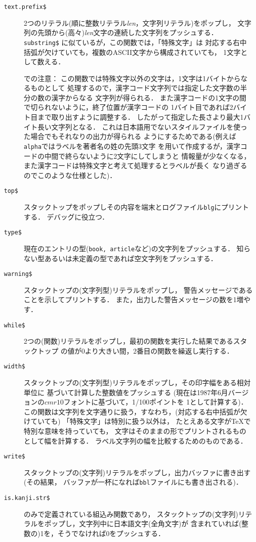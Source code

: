 \begin{description}
\item[\hbox{\tt text.prefix\$}\hfill]
2つのリテラル(順に整数リテラル{\it len}，文字列リテラル)をポップし，
文字列の先頭から(高々){\it len}文字の連続した文字列をプッシュする．
{\tt substring\$} に似ているが，この関数では，「特殊文字」は
対応する右中括弧が欠けていても，複数のASCII文字から構成されていても，
1文字として数える．

{\dg \JBibTeX での注意}：
この関数では特殊文字以外の文字は，1文字は1バイトからなるものとして
処理するので，漢字コード文字列では指定した文字数の半分の数の漢字からなる
文字列が得られる．
また漢字コードの1文字の間で切られないように，終了位置が漢字コードの
1バイト目であれば2バイト目まで取り出すように調整する．
したがって指定した長さより最大1バイト長い文字列となる．
これは日本語用でないスタイルファイルを使った場合でもそれなりの出力が得られる
ようにするためである(例えば{\tt alpha}ではラベルを著者名の姓の先頭3文字
を用いて作成するが，漢字コードの中間で終らないように2文字にしてしまうと
情報量が少なくなる，また漢字コードは特殊文字と考えて処理するとラベルが長く
なり過ぎるのでこのような仕様とした)．

\item[\hbox{\tt top\$}\hfill]
スタックトップをポップしその内容を端末とログファイル{\tt blg}にプリントする．
デバッグに役立つ．

\item[\hbox{\tt type\$}\hfill]
現在のエントリの型({\tt book, article}など)の文字列をプッシュする．
知らない型あるいは未定義の型であれば空文字列をプッシュする．

\item[\hbox{\tt warning\$}\hfill]
スタックトップの(文字列型)リテラルをポップし，
警告メッセージであることを示してプリントする．
また，出力した警告メッセージの数を1増やす．

\item[\hbox{\tt while\$}\hfill]
2つの(関数)リテラルをポップし，最初の関数を実行した結果であるスタックトップ
の値が0より大きい間，2番目の関数を繰返し実行する．

\item[\hbox{\tt width\$}\hfill]
スタックトップの(文字列型)リテラルをポップし，その印字幅をある相対単位に
基づいて計算した整数値をプッシュする
(現在は1987年6月バージョンの$cmr10$フォントに基づいて，1/100ポイントを
1として計算する)．
この関数は文字列を文字通りに扱う，すなわち，(対応する右中括弧が欠けていても)
「特殊文字」は特別に扱う以外は，
たとえある文字が\TeX で特別な意味を持っていても，
文字はそのままの形でプリントされるものとして幅を計算する．
ラベル文字列の幅を比較するためのものである．

\item[\hbox{\tt write\$}\hfill]
スタックトップの(文字列)リテラルをポップし，出力バッファに書き出す(その結果，
バッファが一杯になれば{\tt bbl}ファイルにも書き出される)．

\item[\hbox{\tt is.kanji.str\$}\hfill]
\JBibTeX のみで定義されている組込み関数であり，
スタックトップの(文字列)リテラルをポップし，文字列中に日本語文字(全角文字)が
含まれていれば(整数の)1を，そうでなければ0をプッシュする．

\end{description}

